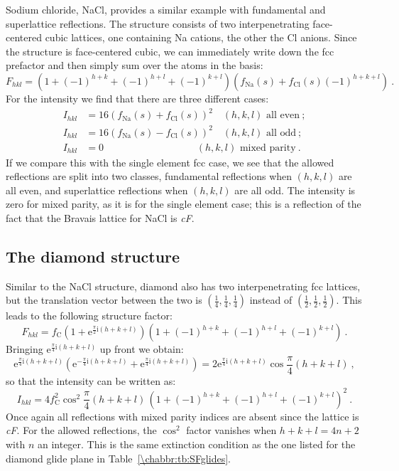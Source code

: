 Sodium chloride, NaCl, provides a similar example with fundamental and superlattice reflections. The structure consists of two interpenetrating face-centered cubic lattices, one containing Na cations, the other the Cl anions.  Since the structure is face-centered cubic, we can immediately write down the fcc prefactor and then simply sum over the atoms in the basis:
\[
	F_{hkl} = \left(1+(-1)^{h+k}+(-1)^{h+l}+(-1)^{k+l}\right) \left(f_{\text{Na}}(s) + f_{\text{Cl}}(s)(-1)^{h+k+l}\right)\ .
\]
For the intensity we find that there are three different cases:
\begin{equation}
\begin{split}
	I_{hkl} &= 16(f_{\text{Na}}(s) + f_{\text{Cl}}(s))^2\quad (h,k,l)\text{ all even}\ ;\\
	I_{hkl} &= 16(f_{\text{Na}}(s) - f_{\text{Cl}}(s))^2\quad (h,k,l)\text{ all odd}\ ;\\
	I_{hkl} &= 0 \qquad\qquad\qquad\qquad\quad\,\, (h,k,l)\text{ mixed parity}\ .
\end{split}
\end{equation}
If we compare this with the single element fcc case, we see that the allowed reflections are split into two classes, fundamental reflections when $(h,k,l)$ are all even, and superlattice reflections when $(h,k,l)$ are all odd.  The intensity is zero for mixed parity, as it is for the single element case; this is a reflection of the fact that the Bravais lattice for NaCl is \textit{cF}.

\subsection{The diamond structure}\label{\chabbr:ssec:SFdiamond}
Similar to the NaCl structure, diamond also has two interpenetrating fcc lattices, but the translation vector between the two is $(\frac{1}{4},\frac{1}{4},\frac{1}{4})$ instead of $(\frac{1}{2},\frac{1}{2},\frac{1}{2})$. This leads to the following structure factor:
\[
	F_{hkl}=f_{\text{C}}\left(1+\mathrm{e}^{\frac{\pi}{2}\mathrm{i}(h+k+l)}\right)\left(1+(-1)^{h+k}+(-1)^{h+l}+(-1)^{k+l}\right)\ .
\]
Bringing $\mathrm{e}^{\frac{\pi}{4}\mathrm{i}(h+k+l)}$ up front we obtain:
\[
	\mathrm{e}^{\frac{\pi}{4}\mathrm{i}(h+k+l)}\left(\mathrm{e}^{-\frac{\pi}{4}\mathrm{i}(h+k+l)}+\mathrm{e}^{\frac{\pi}{4}\mathrm{i}(h+k+l)}\right) = 2\mathrm{e}^{\frac{\pi}{4}\mathrm{i}(h+k+l)} \cos\frac{\pi}{4}(h+k+l)\ ,
\]
so that the intensity can be written as:
\begin{equation}
	I_{hkl}=4f^2_{\text{C}}\cos^2\frac{\pi}{4}(h+k+l)\,\left(1+(-1)^{h+k}+(-1)^{h+l}+(-1)^{k+l}\right)^2\ .\label{\chabbr:eq:Idiamond}
\end{equation}
Once again all reflections with mixed parity indices are absent since the lattice is \textit{cF}. For the allowed reflections, the $\cos^2$ factor vanishes when $h+k+l=4n+2$ with $n$ an integer.  This is the same extinction condition as the one listed for the diamond glide plane in Table~\ref{\chabbr:tb:SFglides}.

